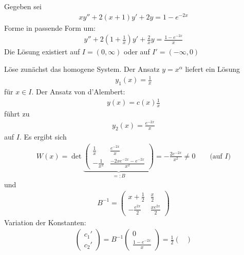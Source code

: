 \begin{example} \label{thm:4.7}
  Gegeben sei
  \begin{align*}
    xy'' + 2(x+1)y' + 2y = 1 - e^{-2x}
  \end{align*}
  Forme in passende Form um:
  \begin{align*}
    y'' + 2(1+\tfrac 1x) y' + \frac 2x y = \frac {1-e^{-2x}}x
  \end{align*}
  Die Lösung existiert auf $I = (0,\infty)$ oder auf $I' = (-\infty,0)$
  \begin{enum-arab}
  \item
    Löse zunächst das homogene System.
    Der Ansatz $y = x^{\alpha}$ liefert ein Lösung
    \begin{align*}
      y_1(x) = \frac 1 x
    \end{align*}
    für $x \in I$.
    Der Ansatz von d'Alembert:
    \begin{align*}
      y(x) = c(x) \frac 1x
    \end{align*}
    führt zu
    \begin{align*}
      y_2(x) = \frac {e^{-2x}}x
    \end{align*}
    auf $I$.
    Es ergibt sich
    \begin{align*}
      W(x) = \det \underbrace{\begin{pmatrix}
          \frac 1x & \frac {e^{-2x}}{x} \\
          - \frac 1{x^2} & \frac {-2xe^{-2x}-e^{-2x}}{x^2}
        \end{pmatrix}}_{=:B} = - \frac {2e^{-2x}}{x^2} \neq 0 \qquad \text{(auf $I$)}
    \end{align*}
    und
    \begin{align*}
      B^{-1} = \begin{pmatrix}
        x+\frac 12 & \frac x2 \\
        -\frac {e^{2x}}{2} & \frac {xe^{2x}}2
      \end{pmatrix}
    \end{align*}
    Variation der Konstanten:
    \begin{align*}
      \begin{pmatrix}
        c_1' \\ c_2'
      \end{pmatrix} = B^{-1} \begin{pmatrix}
        0 \\ \frac {1-e^{-2x}}x
      \end{pmatrix} = \frac 12 \begin{pmatrix}

\end{pmatrix}
\end{align*}
\end{enum-arab}
\end{example}
